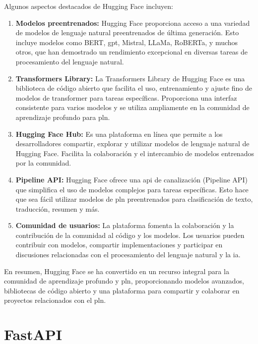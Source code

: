 Algunos aspectos destacados de Hugging Face incluyen\cite{HuggingFace}:
\begin{enumerate}

\item \textbf{Modelos preentrenados:} Hugging Face proporciona acceso a una variedad de modelos de lenguaje natural preentrenados de última generación. Esto incluye modelos como BERT, \acrshort{gpt}, Mistral, LLaMa, RoBERTa, y muchos otros, que han demostrado un rendimiento excepcional en diversas tareas de procesamiento del lenguaje natural.

\item \textbf{Transformers Library:} La Transformers Library de Hugging Face es una biblioteca de código abierto que facilita el uso, entrenamiento y ajuste fino de modelos de transformer para tareas específicas. Proporciona una interfaz consistente para varios modelos y se utiliza ampliamente en la comunidad de aprendizaje profundo para \acrshort{pln}.

\item \textbf{Hugging Face Hub:} Es una plataforma en línea que permite a los desarrolladores compartir, explorar y utilizar modelos de lenguaje natural de Hugging Face. Facilita la colaboración y el intercambio de modelos entrenados por la comunidad.

\item \textbf{Pipeline API:} Hugging Face ofrece una \acrshort{api} de canalización (Pipeline API) que simplifica el uso de modelos complejos para tareas específicas. Esto hace que sea fácil utilizar modelos de \acrshort{pln} preentrenados para clasificación de texto, traducción, resumen y más.

\item \textbf{Comunidad de usuarios:} La plataforma fomenta la colaboración y la contribución de la comunidad al código y los modelos. Los usuarios pueden contribuir con modelos, compartir implementaciones y participar en discusiones relacionadas con el procesamiento del lenguaje natural y la \acrlong{ia}.
\end{enumerate}

En resumen, Hugging Face se ha convertido en un recurso integral para la comunidad de aprendizaje profundo y \acrshort{pln}, proporcionando modelos avanzados, bibliotecas de código abierto y una plataforma para compartir y colaborar en proyectos relacionados con el \acrlong{pln}.

\section{FastAPI}

